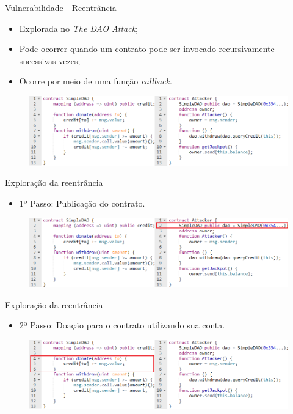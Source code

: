 \begin{frame}{Vulnerabilidade - Reentrância}
    \begin{itemize}
        \item Explorada no \textit{The DAO Attack};
        \item Pode ocorrer quando um contrato pode ser invocado recursivamente sucessivas vezes;
        \item Ocorre por meio de uma função \textit{callback}.
    \end{itemize}
    \begin{figure}[!htb]
        \centering
        \includegraphics[scale=0.45]{figuras/contratos-inteligentes/reentrancia-exemplo.png}
    \end{figure}
\end{frame}

\begin{frame}{Exploração da reentrância}
    \begin{itemize}
        \item 1º Passo: Publicação do contrato.
    \end{itemize}
    \begin{figure}[!htb]
     \centering
     \includegraphics[scale=0.45]{figuras/contratos-inteligentes/reentrancia-passo-1.png}
    \end{figure}    
\end{frame}

\begin{frame}{Exploração da reentrância}
    \begin{itemize}
        \item 2º Passo: Doação para o contrato utilizando sua conta.
    \end{itemize}
    \begin{figure}[!htb]
     \centering
     \includegraphics[scale=0.45]{figuras/contratos-inteligentes/reentrancia-passo-2.png}
    \end{figure}     
\end{frame}

